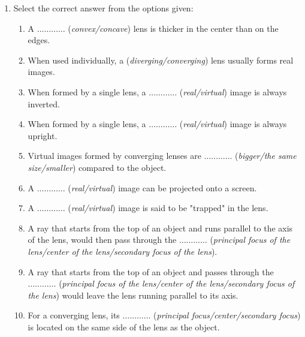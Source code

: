 \begin{eocexercises}{}
\begin{enumerate}
\item{Select the correct answer from the options given:
\begin{enumerate}
\item A $\ldots\ldots\ldots\ldots$ (\textit{convex/concave}) lens is thicker in the center than on the edges.
\item When used individually, a (\textit{diverging/converging}) lens usually forms real images.
\item When formed by a single lens, a $\ldots\ldots\ldots\ldots$ (\textit{real/virtual}) image is always inverted.
\item When formed by a single lens, a $\ldots\ldots\ldots\ldots$ (\textit{real/virtual}) image is always upright.
\item Virtual images formed by converging lenses are $\ldots\ldots\ldots\ldots$ (\textit{bigger/the same size/smaller}) compared to the object.
\item A $\ldots\ldots\ldots\ldots$ (\textit{real/virtual}) image can be projected onto a screen.
\item A $\ldots\ldots\ldots\ldots$ (\textit{real/virtual}) image is said to be "trapped" in the lens.
\item A ray that starts from the top of an object and runs parallel to the axis of the lens, would then pass through the $\ldots\ldots\ldots\ldots$ (\textit{principal focus of the lens/center of the lens/secondary focus of the lens}).
\item A ray that starts from the top of an object and passes through the $\ldots\ldots\ldots\ldots$ (\textit{principal focus of the lens/center of the lens/secondary focus of the lens}) would leave the lens running parallel to its axis.
\item For a converging lens, its $\ldots\ldots\ldots\ldots$ (\textit{principal focus/center/secondary focus}) is located on the same side of the lens as the object.

\end{enumerate}}
\end{enumerate}
\end{eocexercises}
